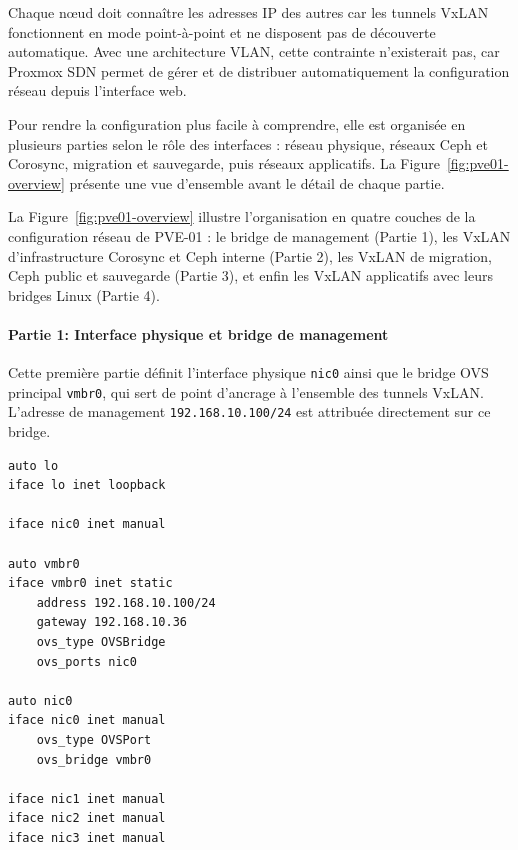 \par Chaque nœud doit connaître les adresses IP des autres car les tunnels VxLAN fonctionnent en mode point-à-point et ne disposent pas de découverte automatique. Avec une architecture VLAN, cette contrainte n'existerait pas, car Proxmox SDN permet de gérer et de distribuer automatiquement la configuration réseau depuis l'interface web. \\

\par Pour rendre la configuration plus facile à comprendre, elle est organisée en plusieurs parties selon le rôle des interfaces : réseau physique, réseaux Ceph et Corosync, migration et sauvegarde, puis réseaux applicatifs. La Figure~\ref{fig:pve01-overview} présente une vue d'ensemble avant le détail de chaque partie. \\



\par La Figure~\ref{fig:pve01-overview} illustre l'organisation en quatre couches de la configuration réseau de PVE-01 : le bridge de management (Partie 1), les VxLAN d'infrastructure Corosync et Ceph interne (Partie 2), les VxLAN de migration, Ceph public et sauvegarde (Partie 3), et enfin les VxLAN applicatifs avec leurs bridges Linux (Partie 4).\\

\paragraph{Partie 1: Interface physique et bridge de management}

\par Cette première partie définit l'interface physique \texttt{nic0} ainsi que le bridge OVS principal \texttt{vmbr0}, qui sert de point d'ancrage à l'ensemble des tunnels VxLAN. L'adresse de management \texttt{192.168.10.100/24} est attribuée directement sur ce bridge.\\

\begin{lstlisting}[style=sonacode,language={},caption={Interfaces de base et bridge OVS de management},label={lst:pve01-base}]
auto lo
iface lo inet loopback

iface nic0 inet manual

auto vmbr0
iface vmbr0 inet static
    address 192.168.10.100/24
    gateway 192.168.10.36
    ovs_type OVSBridge
    ovs_ports nic0

auto nic0
iface nic0 inet manual
    ovs_type OVSPort
    ovs_bridge vmbr0

iface nic1 inet manual
iface nic2 inet manual
iface nic3 inet manual
\end{lstlisting}

